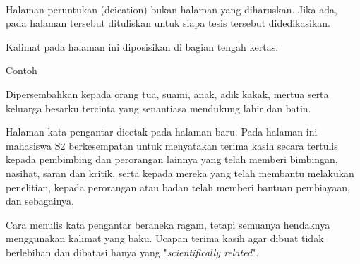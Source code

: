 \documentclass{itb-thesis}
\begin{document}
\dedicationpage

\begin{center}

\ 
\vfill
\begin{itshape}
Halaman peruntukan (deication) bukan halaman yang diharuskan. Jika ada, pada halaman tersebut dituliskan untuk siapa tesis tersebut didedikasikan.

Kalimat pada halaman ini diposisikan di bagian tengah kertas.

Contoh

Dipersembahkan kepada orang tua, suami, anak, adik kakak, mertua serta keluarga besarku tercinta yang senantiasa mendukung lahir dan batin.
\end{itshape}
\vfill

\end{center}


\preface

Halaman kata pengantar dicetak pada halaman baru. Pada halaman ini mahasiswa S2 berkesempatan untuk menyatakan terima kasih secara tertulis kepada pembimbing dan perorangan lainnya yang telah memberi bimbingan, nasihat, saran dan kritik, serta kepada mereka yang telah membantu melakukan penelitian, kepada perorangan atau badan telah memberi bantuan pembiayaan, dan sebagainya.

\vspace{14pt}

Cara menulis kata pengantar beraneka ragam, tetapi semuanya hendaknya menggunakan kalimat yang baku. Ucapan terima kasih agar dibuat tidak berlebihan dan dibatasi hanya yang "\textit{scientifically related}".


\tableofcontents
{}


\listoffigures
{}


\listoftables
{}
\end{document}
